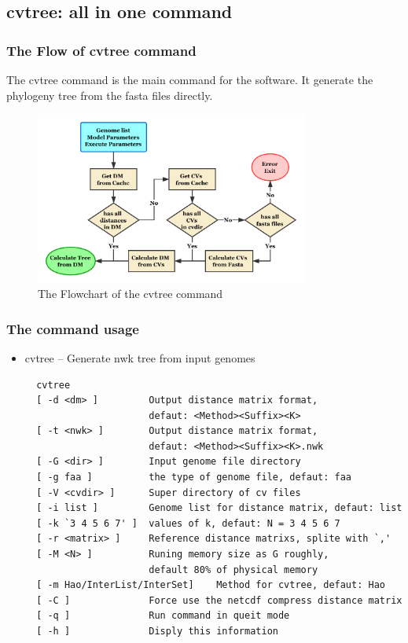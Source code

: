 \documentclass[a4paper,12pt]{article}
\begin{document}
\subsection{cvtree: all in one command}
\subsubsection{The Flow of cvtree command}
The cvtree command is the main command for the software.
It generate the phylogeny tree from the fasta files directly.

\begin{figure}[!h]
	\centering
	\includegraphics[width=0.8\textwidth]{Flowchart.pdf}
	\caption{The Flowchart of the cvtree command}
\end{figure}

\subsubsection{The command usage}
\begin{itemize}\itemsep 0pt
	\item cvtree -- Generate nwk tree from input genomes
	\begin{verbatim}
  cvtree
  [ -d <dm> ]         Output distance matrix format, 
                      defaut: <Method><Suffix><K>
  [ -t <nwk> ]        Output distance matrix format, 
                      defaut: <Method><Suffix><K>.nwk
  [ -G <dir> ]        Input genome file directory
  [ -g faa ]          the type of genome file, defaut: faa
  [ -V <cvdir> ]      Super directory of cv files
  [ -i list ]         Genome list for distance matrix, defaut: list
  [ -k `3 4 5 6 7' ]  values of k, defaut: N = 3 4 5 6 7
  [ -r <matrix> ]     Reference distance matrixs, splite with `,'
  [ -M <N> ]          Runing memory size as G roughly,
                      default 80% of physical memory
  [ -m Hao/InterList/InterSet]    Method for cvtree, defaut: Hao
  [ -C ]              Force use the netcdf compress distance matrix
  [ -q ]              Run command in queit mode
  [ -h ]              Disply this information 
\end{verbatim}
\end{itemize}
\end{document}
